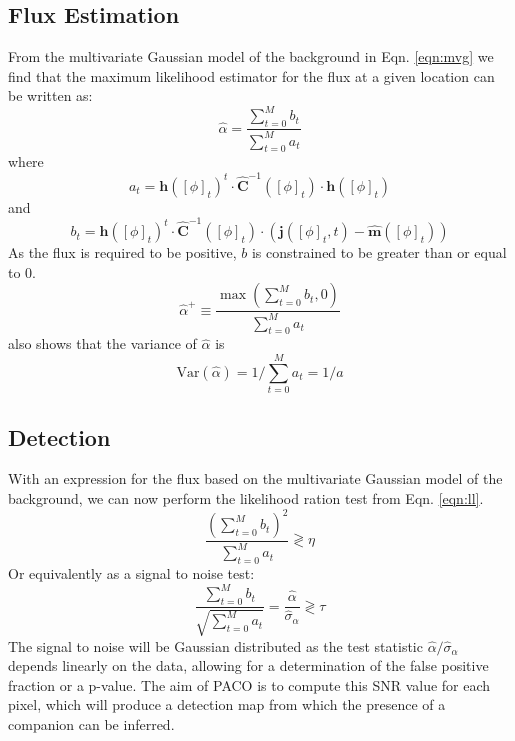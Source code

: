 \documentclass[twocolumn,fleqn]{aastex62}
\begin{document}
\subsection{Flux Estimation}
From the multivariate Gaussian model of the background in Eqn. \ref{eqn:mvg} we find that the maximum likelihood estimator for the flux at a given location can be written as:
\begin{equation}
\hat{\alpha} = \frac{\sum_{t = 0}^{M}b_{t}}{\sum_{t = 0}^{M}a_{t}}
\end{equation}
where
\begin{equation}
a_{t} = \mathbf{h}([\phi]_{t})^{t}\cdot\hat{\mathbf{C}}^{-1}([\phi]_{t})\cdot\mathbf{h}([\phi]_{t})
\end{equation}
and
\begin{equation}
b_{t} = \mathbf{h}([\phi]_{t})^{t}\cdot\hat{\mathbf{C}}^{-1}([\phi]_{t})\cdot\left( \mathbf{j}([\phi]_{t},t) - \hat{\mathbf{m}}([\phi]_{t})\right)
\end{equation}
As the flux is required to be positive, $b$ is constrained to be greater than or equal to 0.
\begin{equation}
\hat{\alpha}^{+} \equiv \frac{\max\left(\sum_{t = 0}^{M}b_{t},0\right)}{\sum_{t = 0}^{M}a_{t}}
\end{equation}
\cite{PACO} also shows that the variance of $\hat{\alpha}$ is 
\begin{equation}
\textrm{Var}(\hat{\alpha}) = 1/\sum_{t=0}^{M}a_{t} = 1/a
\end{equation}
\subsection{Detection}
With an expression for the flux based on the multivariate Gaussian model of the background, we can now perform the likelihood ration test from Eqn. \ref{eqn:ll}.
\begin{equation}
\frac{\left(\sum_{t = 0}^{M}b_{t}\right)^{2}}{\sum_{t = 0}^{M}a_{t}} \gtrless \eta
\end{equation}
Or equivalently as a signal to noise test:
\begin{equation}
\frac{\sum_{t = 0}^{M}b_{t}}{\sqrt{\sum_{t = 0}^{M}a_{t}}} = \frac{\hat{\alpha}}{\hat{\sigma}_{\alpha}} \gtrless \tau
\end{equation}
The signal to noise will be Gaussian distributed as the test statistic $\hat{\alpha}/\hat{\sigma}_{\alpha}$ depends linearly on the data, allowing for a determination of the false positive fraction or a p-value.
The aim of PACO is to compute this SNR value for each pixel, which will produce a detection map from which the presence of a companion can be inferred.
\end{document}
